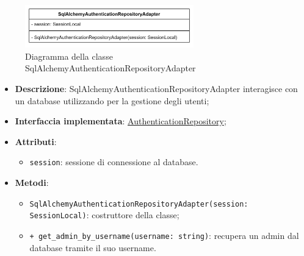  \label{SqlAlchemyAuthenticationRepositoryAdapter}
\begin{figure}[H]
    \centering
    \includegraphics[width=0.65\textwidth]{assets/Backend/sql_alchemy_authentication_repository_adapter.png}
    \caption{Diagramma della classe SqlAlchemyAuthenticationRepositoryAdapter}
  \end{figure}
\begin{itemize}
    \item \textbf{Descrizione}: SqlAlchemyAuthenticationRepositoryAdapter interagisce con un database utilizzando  per la gestione degli utenti;
    \item \textbf{Interfaccia implementata}: \hyperref[AuthenticationRepository]{AuthenticationRepository};
    \item \textbf{Attributi}:
    \begin{itemize}
        \item \texttt{session}: sessione di connessione al database.
    \end{itemize}
    \item \textbf{Metodi}:
    \begin{itemize}
        \item \texttt{SqlAlchemyAuthenticationRepositoryAdapter(session: SessionLocal)}: costruttore della classe;
        \item \texttt{+ get\_admin\_by\_username(username: string)}: recupera un admin dal database tramite il suo username.
    \end{itemize}
\end{itemize} 

